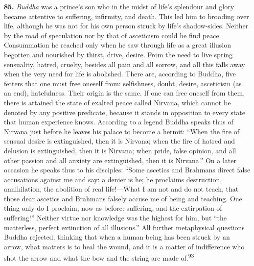 \documentclass[12pt,a4paper]{book}
\newcommand{\opage}[1]{\marginnote{\footnotesize\textit{[#1]}}}
\begin{document}
\noindent\textbf{85.} \emph{Buddha} was a prince's son who in the midst of life's splendour and
glory became attentive to suffering, infirmity, and death. This led him to brooding over life,
although he was not for his own person struck by life's shadow-sides. Neither by the road of
speculation nor by that of asceticism could he find peace. Consummation he reached only when he saw
through life as a great illusion begotten and nourished by thirst, drive, desire. From the need to
live spring sensuality, hatred, cruelty, besides all pain and all sorrow, and all this falls away
when the very need for life is abolished. There are, according to Buddha, five fetters that one must
free oneself from: selfishness, doubt, desire, asceticism (as an end), hatefulness. Their origin is
the same. If one can free oneself from them, there is attained the state of exalted peace called
Nirvana, which cannot be denoted by any positive predicate, because it stands in opposition to every
state that human experience knows. According to a legend Buddha speaks thus of Nirvana just before he
leaves his palace to become a hermit: ``When the fire of sensual desire is extinguished, then it is
Nirvana; when the fire of hatred and delusion is 
\opage{195}extinguished, then it is Nirvana; when pride, false
opinion, and all other passion and all anxiety are extinguished, then it is Nirvana.'' On a later
occasion he speaks thus to his disciples: ``Some ascetics and Brahmans direct false accusations
against me and say: a denier is he; he proclaims destruction, annihilation, the abolition of real
life!---What I am not and do not teach, that those dear ascetics and Brahmans falsely accuse me of
being and teaching. One thing only do I proclaim, now as before: suffering, and the extirpation of
suffering!'' Neither virtue nor knowledge was the highest for him, but ``the matterless, perfect
extinction of all illusions.'' All further metaphysical questions Buddha rejected, thinking that when
a human being has been struck by an arrow, what matters is to heal the wound, and it is a matter of
indifference who shot the arrow and what the bow and the string are made of.\textsuperscript{93}
\end{document}
